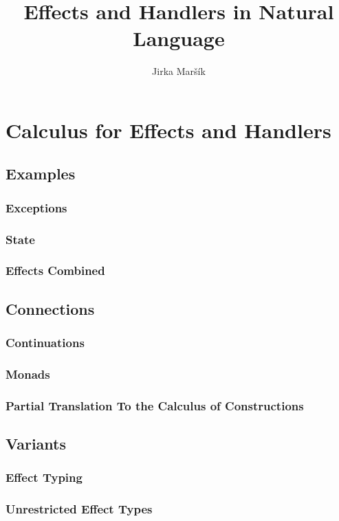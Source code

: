 \documentclass{report}
\title{Effects and Handlers in Natural Language}
\author{Jirka Maršík}
\begin{document}
\maketitle

\tableofcontents

\part{Calculus for Effects and Handlers}





\chapter{Examples}
\section{Exceptions}
\section{State}
\section{Effects Combined}

\chapter{Connections}
\section{Continuations}
\section{Monads}
\section{Partial Translation To the Calculus of Constructions}

\chapter{Variants}
\section{Effect Typing}
\section{Unrestricted Effect Types}
\end{document}
